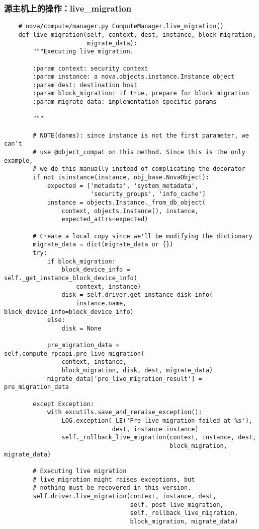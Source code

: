 \documentclass[a4paper,left=1.5cm,right=1.5cm,11pt]{article}
\begin{document}
\subsubsection{源主机上的操作：live\_migration}
    \begin{lstlisting}
    # nova/compute/manager.py ComputeManager.live_migration()
    def live_migration(self, context, dest, instance, block_migration,
                       migrate_data):
        """Executing live migration.

        :param context: security context
        :param instance: a nova.objects.instance.Instance object
        :param dest: destination host
        :param block_migration: if true, prepare for block migration
        :param migrate_data: implementation specific params

        """

        # NOTE(danms): since instance is not the first parameter, we can't
        # use @object_compat on this method. Since this is the only example,
        # we do this manually instead of complicating the decorator
        if not isinstance(instance, obj_base.NovaObject):
            expected = ['metadata', 'system_metadata',
                        'security_groups', 'info_cache']
            instance = objects.Instance._from_db_object(
                context, objects.Instance(), instance,
                expected_attrs=expected)

        # Create a local copy since we'll be modifying the dictionary
        migrate_data = dict(migrate_data or {})
        try:
            if block_migration:
                block_device_info = self._get_instance_block_device_info(
                    context, instance)
                disk = self.driver.get_instance_disk_info(
                    instance.name, block_device_info=block_device_info)
            else:
                disk = None

            pre_migration_data = self.compute_rpcapi.pre_live_migration(
                context, instance,
                block_migration, disk, dest, migrate_data)
            migrate_data['pre_live_migration_result'] = pre_migration_data

        except Exception:
            with excutils.save_and_reraise_exception():
                LOG.exception(_LE('Pre live migration failed at %s'),
                              dest, instance=instance)
                self._rollback_live_migration(context, instance, dest,
                                              block_migration, migrate_data)

        # Executing live migration
        # live_migration might raises exceptions, but
        # nothing must be recovered in this version.
        self.driver.live_migration(context, instance, dest,
                                   self._post_live_migration,
                                   self._rollback_live_migration,
                                   block_migration, migrate_data)
    \end{lstlisting}
\end{document}
